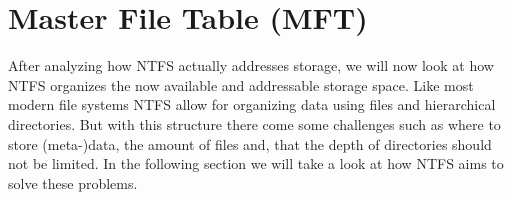 \section{Master File Table (MFT)}
\label{sec:MFT}
After analyzing how NTFS actually addresses storage, we will now look at how NTFS organizes the now available and addressable storage space. Like most modern file systems NTFS allow for organizing data using files and hierarchical directories. But with this structure there come some challenges such as where to store (meta-)data, the amount of files and, that the depth of directories should not be limited. In the following section we will take a look at how NTFS aims to solve these problems.\\


